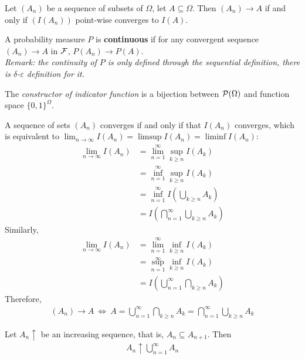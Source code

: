 \documentclass{article}
\begin{document}
   	\begin{definition}
   		Let $(A_n)$ be a sequence of subsets of $\Omega$, let $A \subseteq \Omega$. Then $(A_n) \to A$ if and only if $(I(A_n))$ point-wise converges to $I(A)$.
   	\end{definition}
   	
   	\begin{definition}
   		A probability measure $P$ is \textbf{continuous} if for any convergent sequence $(A_n) \to A$ in $\mathcal{{F}}$, $P(A_n) \to P(A)$. \\
   		\emph{Remark: the continuity of $P$ is only defined through the sequential definition, there is $\delta$-$\varepsilon$ definition for it.}
   	\end{definition}
   	
   	\begin{remark}
   		The \emph{constructor of indicator function} is a bijection between $\mathcal{{P}}(\Omega)$ and function space $\{0, 1\}^\Omega$.
   	\end{remark}
   	
   	\begin{proposition}
   		A sequence of sets $(A_n)$ converges if and only if that $I(A_n)$ converges, which is equivalent to $\lim_{n \to \infty} I(A_n) = \limsup I(A_n) = \liminf I(A_n)$:
   		\begin{align}
   			\lim_{n \to \infty} I(A_n) &= \lim_{n=1}^\infty \sup_{k\geq n} I(A_k) \\
   			&=\inf_{n=1}^\infty \sup_{k\geq n} I(A_k) \\
   			&=\inf_{n=1}^\infty I(\bigcup_{k \geq n} A_k) \\
   			&=I(\bigcap_{n=1}^\infty \bigcup_{k \geq n} A_k)
   		\end{align}
   		Similarly,
   		\begin{align}
   			\lim_{n \to \infty} I(A_n) &= \lim_{n=1}^\infty \inf_{k\geq n} I(A_k) \\
   			&= \sup_{n=1}^\infty \inf_{k\geq n} I(A_k) \\
   			&= I(\bigcup_{n=1}^\infty \bigcap_{k \geq n} A_k)
   		\end{align}
   		Therefore, 
   		\begin{align}
   			(A_n) \to A\ \iff\ A = \bigcup_{n=1}^\infty \bigcap_{k \geq n} A_k = \bigcap_{n=1}^\infty \bigcup_{k \geq n} A_k
   		\end{align}
   	\end{proposition}
   	
   	\begin{corollary}
   		Let $A_n \uparrow$ be an increasing sequence, that is, $A_n \subseteq A_{n+1}$. Then
   		\begin{align}
   			A_n \uparrow \bigcup_{n=1}^\infty A_n
   		\end{align}
   	\end{corollary}
   	
\end{document}

